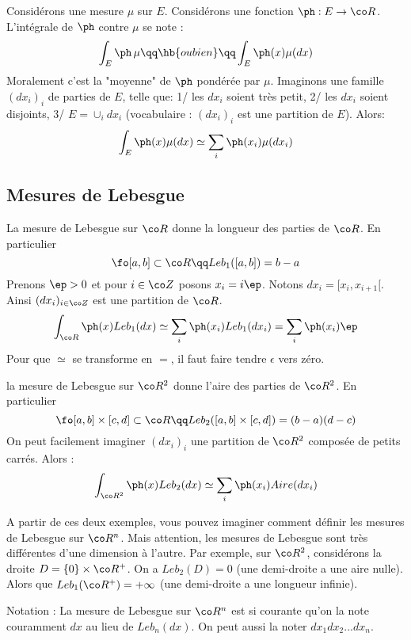 \documentclass{article}
\begin{document}
Considérons une mesure $\mu$ sur $E$.  Considérons une fonction $\ph : E \to \co R$.  L'intégrale de $\ph$ contre $\mu$ se note :
$$
\int_E \ph \, \mu  \qq \hb{ou bien} \qq \int_E \ph(x) \mu(dx) 
$$ 
Moralement c'est la "moyenne" de $\ph$ pondérée par $\mu$. Imaginons une famille  $(dx_i)_{i}$ de parties de $E$, telle que:  1/ les $dx_i$ soient très petit, 2/ les $dx_i$ soient disjoints, 3/  $E=\cup_i dx_i$  (vocabulaire : $(dx_i)_{i}$ est une partition de $E$). Alors:
$$
\int_E \ph(x) \mu(dx)  \simeq \sum_{i} \ph(x_i) \mu(dx_i) 
$$

\subsection{Mesures de Lebesgue}

\begin{exemple} La mesure de Lebesgue sur $\co R$ donne la longueur des parties de $\co R$. En particulier
$$
\fo [a,b] \subset \co R \qq Leb_1([a,b]) = b-a
$$
Prenons $\ep>0$ et pour $i\in \co Z$ posons $x_i= i \ep $. Notons $dx_i=[x_i,x_{i+1}[$. Ainsi $(dx_i)_{i\in \co Z}$ est une partition de $\co R$. 
$$
\int_{\co R} \ph(x) Leb_1{(dx)} \simeq \sum_i \ph(x_i) Leb_1(dx_i) =   \sum_i \ph(x_i) \ep
$$
Pour que $\simeq$ se transforme en $=$, il faut faire tendre $\epsilon$ vers zéro.  
\end{exemple}


\begin{exemple} la mesure de Lebesgue sur $\co R^2$ donne l'aire des parties de $\co R^2$. En particulier 
$$
\fo [a,b] \times [c,d]  \subset \co R \qq Leb_2([a,b]\times [c,d]) = (b-a)(d-c)
$$
On peut facilement imaginer $(dx_i)_{i}$ une partition de $\co R^2$ composée de petits carrés. Alors :
$$
\int_{\co R^2} \ph(x) Leb_2{(dx)} \simeq \sum_i \ph(x_i) Aire(dx_i) 
$$
\end{exemple}


A partir de ces deux exemples, vous pouvez imaginer comment définir les mesures de Lebesgue sur $\co R^n$.    Mais attention, les mesures de Lebesgue sont très différentes d'une dimension à l'autre. Par exemple, sur $\co R^2$, considérons la droite $D=\{0\} \times \co R^+$. On a $Leb _2 (D)  = 0$ (une demi-droite a une aire nulle).  Alors que $Leb_1(\co R^+)  = +\infty$ (une demi-droite a une longueur infinie). 


Notation :   La mesure de Lebesgue sur $\co R^n$ est si courante qu'on la note couramment $dx$ au lieu de $Leb_n(dx)$. On peut aussi la noter $dx_1dx_2 ... dx_n$. 
\end{document}
